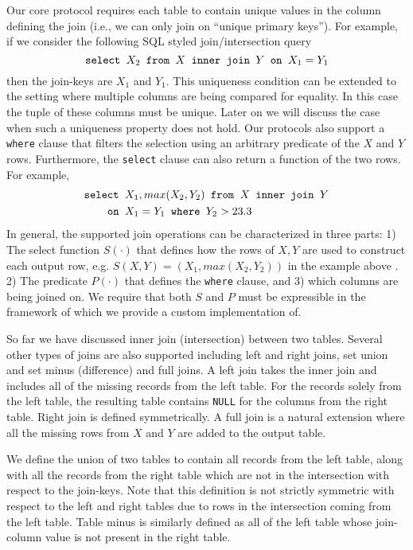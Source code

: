 \documentclass[11pt,letterpaper]{article}
\begin{document}
\fi
Our core protocol requires each table to contain unique values in the column defining the join  (i.e., we can only join on ``unique primary keys''). For example, if we consider the following SQL styled join/intersection query
\vspace{-0.1cm}
$$
\texttt{select } X_2 \texttt{ from } X \texttt{ inner join } Y \texttt{ on } X_1 = Y_1
\vspace{-0.1cm}
$$
then the join-keys are $X_1$ and $Y_1$. This uniqueness condition can be extended to the setting where multiple columns are being compared for equality. 
\iffullversion
In this case the tuple of these columns must be unique. 
\fi
Later on we will discuss the case when such a uniqueness property does not hold. Our protocols also support a \texttt{where} clause that filters the selection using an arbitrary predicate of the $X$ and $Y$ rows. Furthermore, the \texttt{select} clause can also return a function of the two rows. For example,
\vspace{-0.1cm}
\begin{align*}
\texttt{select }&  X_1,max(X_2, Y_2)  \texttt{ from } X \texttt{ inner join } Y \\
\texttt{on }& X_1 = Y_1 \texttt{ where } Y_2 > 23.3
\vspace{-0.1cm}
\end{align*}
In general, the supported join operations can be characterized in three parts: 1) The select function $S(\cdot)$ that defines how the rows of $X,Y$ are used to construct each output row, e.g. $S(X,Y)=(X_1, max(X_2,Y_2))$
\iffullversion
in the example above
\fi. 2) The predicate $P(\cdot)$ that defines the \texttt{where} clause, and 3) which columns are being joined on.
\iffullversion
 We require that both $S$ and $P$ must be expressible in the framework of \cite{aby3} which we provide a custom implementation of.
\fi

\iffullversion
So far we have discussed inner join (intersection) between two tables. 
\fi
Several other types of joins are also supported including left and right joins, set union and set minus (difference) and full joins. A left join takes the inner join and includes all of the missing records from the left table. For the records solely from the left table, the resulting table contains \texttt{NULL} for the columns from the right table. Right join is defined symmetrically. A full join is a natural extension where all the missing rows from $X$ and $Y$ are added to the output table.

We define the union of two tables to contain all records from the left table, along with all the records from the right table which are not in the intersection with respect to the join-keys. Note that this definition is not strictly symmetric with respect to the left and right tables due to rows in the intersection coming from the left table. Table minus is similarly defined as all of the left table whose join-column value is not present in the right table. 
\end{document}
